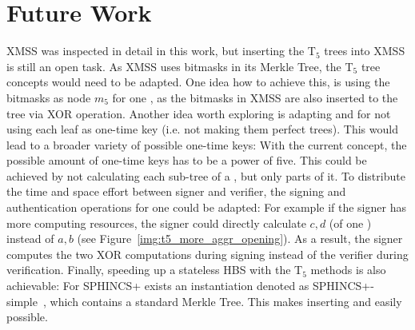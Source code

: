 \section{Future Work}
XMSS was inspected in detail in this work, but inserting the T$_5$ trees into XMSS is still an open task. As XMSS uses bitmasks in its Merkle Tree, the T$_5$ tree concepts would need to be adapted. One idea how to achieve this, is using the bitmasks as node $m_5$ for one \tftree, as the bitmasks in XMSS are also inserted to the tree via XOR operation.
Another idea worth exploring is adapting \tftree and \extree for not using each leaf as one-time key (i.e. not making them perfect trees). This would lead to a broader variety of possible one-time keys: With the current concept, the possible amount of one-time keys has to be a power of five. This could be achieved by not calculating each sub-tree of a \tftree, but only parts of it.
To distribute the time and space effort between signer and verifier, the signing and authentication operations for one \tfblock could be adapted: 
For example if the signer has more computing resources, the signer could directly calculate $c,d$ (of one \tfblock) instead of $a,b$ (see Figure~\ref{img:t5_more_aggr_opening}). As a result, the signer computes the two XOR computations during signing instead of the verifier during verification.
Finally, speeding up a stateless HBS with the T$_5$ methods is also achievable: For SPHINCS+ exists an instantiation denoted as SPHINCS+-simple~\cite{sphincs+_submussion_nist_round3}, which contains a standard Merkle Tree. This makes inserting \tftree and \extree easily possible.
